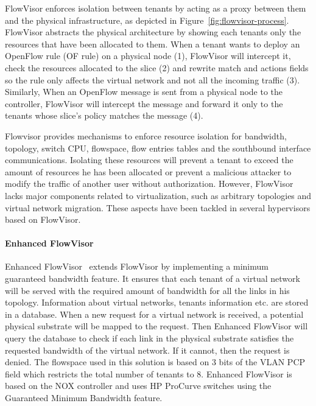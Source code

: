 FlowVisor enforces isolation between tenants by acting as a proxy between them and the physical infrastructure, as depicted in Figure~\ref{fig:flowvisor-process}.
FlowVisor abstracts the physical architecture by showing each tenants only the resources that have been allocated to them.
When a tenant wants to deploy an OpenFlow rule (OF rule) on a physical node (1), FlowVisor will intercept it, check the resources allocated to the slice (2) and rewrite match and actions fields so the rule only affects the virtual network and not all the incoming traffic (3).
Similarly, When an OpenFlow message is sent from a physical node to the controller, FlowVisor will intercept the message and forward it only to the tenants whose slice's policy matches the message (4).

Flowvisor provides mechanisms to enforce resource isolation for bandwidth, topology, switch CPU, flowspace, flow entries tables and the southbound interface communications. 
Isolating these resources will prevent a tenant to exceed the amount of resources he has been allocated or prevent a malicious attacker to modify the traffic of another user without authorization.
However, FlowVisor lacks major components related to virtualization, such as arbitrary topologies and virtual network migration.
These aspects have been tackled in several hypervisors based on FlowVisor.

\paragraph{Enhanced FlowVisor}
Enhanced FlowVisor~\cite{EnhancedFV-Min2012} extends FlowVisor by implementing a minimum guaranteed bandwidth feature. It ensures that each tenant of a virtual network will be served with the required amount of bandwidth for all the links in his topology. Information about virtual networks, tenants information etc. are stored in a database. When a new request for a virtual network is received, a potential physical substrate will be mapped to the request. Then Enhanced FlowVisor will query the database to check if each link in the physical substrate satisfies the requested bandwidth of the virtual network. If it cannot, then the request is denied. 
The flowspace used in this solution is based on 3 bits of the VLAN PCP field which restricts the total number of tenants to 8.
Enhanced FlowVisor is based on the NOX controller and uses HP ProCurve switches using the Guaranteed Minimum Bandwidth feature.

